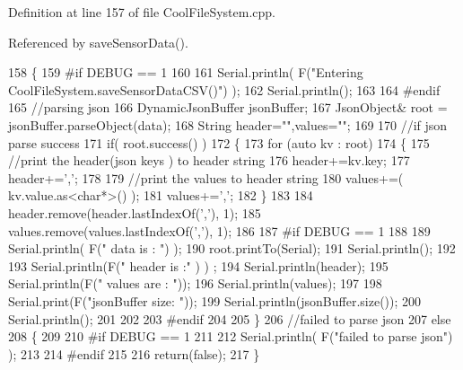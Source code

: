 Definition at line 157 of file Cool\+File\+System.\+cpp.



Referenced by save\+Sensor\+Data().


\begin{DoxyCode}
158 \{
159 \textcolor{preprocessor}{#if DEBUG == 1}
160 
161     Serial.println( F(\textcolor{stringliteral}{"Entering CoolFileSystem.saveSensorDataCSV()"}) );
162     Serial.println();
163 
164 \textcolor{preprocessor}{#endif}
165     \textcolor{comment}{//parsing json}
166     DynamicJsonBuffer jsonBuffer;
167     JsonObject& root = jsonBuffer.parseObject(data);
168     String header=\textcolor{stringliteral}{""},values=\textcolor{stringliteral}{""};
169     
170     \textcolor{comment}{//if json parse success}
171     \textcolor{keywordflow}{if}( root.success() )
172     \{       
173         \textcolor{keywordflow}{for} (\textcolor{keyword}{auto} kv : root) 
174         \{
175             \textcolor{comment}{//print the header(json keys ) to header string}
176             header+=kv.key;
177             header+=\textcolor{charliteral}{','};
178             
179             \textcolor{comment}{//print the values to header string}
180             values+=( kv.value.as<\textcolor{keywordtype}{char}*>() );
181             values+=\textcolor{charliteral}{','};
182         \}
183 
184         header.remove(header.lastIndexOf(\textcolor{charliteral}{','}), 1);
185         values.remove(values.lastIndexOf(\textcolor{charliteral}{','}), 1);      
186     
187 \textcolor{preprocessor}{    #if DEBUG == 1}
188     
189         Serial.println( F(\textcolor{stringliteral}{" data is : "}) );
190         root.printTo(Serial);
191         Serial.println();
192         
193         Serial.println(F(\textcolor{stringliteral}{" header is :"} ) ) ;
194         Serial.println(header);
195         Serial.println(F(\textcolor{stringliteral}{" values are : "}));
196         Serial.println(values);
197         
198         Serial.print(F(\textcolor{stringliteral}{"jsonBuffer size: "}));
199         Serial.println(jsonBuffer.size());
200         Serial.println();
201 
202     
203 \textcolor{preprocessor}{    #endif}
204     
205     \}
206     \textcolor{comment}{//failed to parse json}
207     \textcolor{keywordflow}{else}
208     \{
209     
210 \textcolor{preprocessor}{    #if DEBUG == 1}
211 
212         Serial.println( F(\textcolor{stringliteral}{"failed to parse json"}) );
213     
214 \textcolor{preprocessor}{    #endif}
215 
216         \textcolor{keywordflow}{return}(\textcolor{keyword}{false});
217     \}

\end{DoxyCode}
